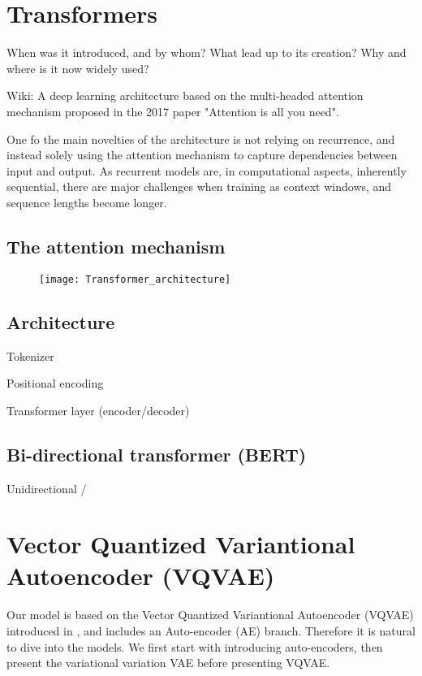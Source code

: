\documentclass[../../thesis.tex]{subfiles}
\begin{document}
\section{Transformers}

When was it introduced, and by whom?
What lead up to its creation?
Why and where is it now widely used? 


Wiki: A deep learning architecture based on the multi-headed attention mechanism proposed in the 2017 paper "Attention is all you need".

One fo the main novelties of the architecture is not relying on recurrence, and instead solely using the attention mechanism to capture dependencies between input and output. As recurrent models are, in computational aspects, inherently sequential, there are major challenges when training as context windows, and sequence lengths become longer. 



\subsection{The attention mechanism}


\begin{figure}[h]
    \texttt{[image: Transformer\_architecture]}
    \centering    
\end{figure}

\subsection{Architecture}

Tokenizer

Positional encoding


Transformer layer (encoder/decoder)

\subsection{Bi-directional transformer (BERT)}

Unidirectional / 



\section{Vector Quantized Variantional Autoencoder (VQVAE)}
Our model is based on the Vector Quantized Variantional Autoencoder (VQVAE) introduced in \cite{VQVAE}, and includes an Auto-encoder (AE) branch. Therefore it is natural to dive into the models. We first start with introducing auto-encoders, then present the variational variation VAE before presenting VQVAE. 
\end{document}
